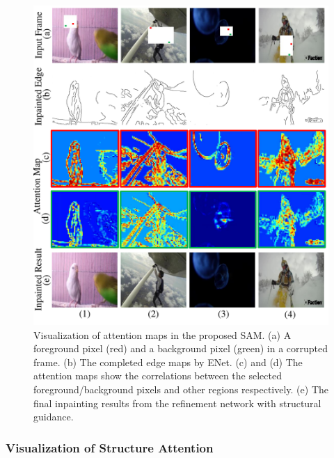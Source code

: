 \begin{figure}[t]
	\centering
	\includegraphics[width=1.0\columnwidth]{att} %
	\caption{Visualization of attention maps in the proposed SAM. 	
	(a) A foreground pixel (red) and a background pixel (green) in a corrupted frame. (b) The completed edge maps by ENet. (c) and (d)
	The attention maps show the correlations between the selected foreground/background pixels and other regions respectively. (e) The final inpainting results from the refinement network with structural guidance. }
	\label{fig:att}
\end{figure}





\subsubsection{Visualization of Structure Attention}

